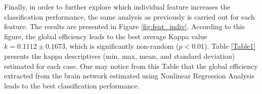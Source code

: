 Finally, in order to further explore which individual feature increases the classification performance, the same analysis as previously is carried out for each feature. The results are presented in Figure  \ref{fig:feat_indiv}. According to this figure, the global efficiency leads to the best average Kappa value $k=0.1112 \pm 0.1673$, which is significantly non-random ($p<0.01$). Table \ref{Table1} presents the kappa descriptives (min, max, mean, and standard deviation) estimated for each case. One may notice from this Table that the global efficiency extracted from the brain network estimated using Nonlinear Regression Analysis leads to the best classification performance. 



